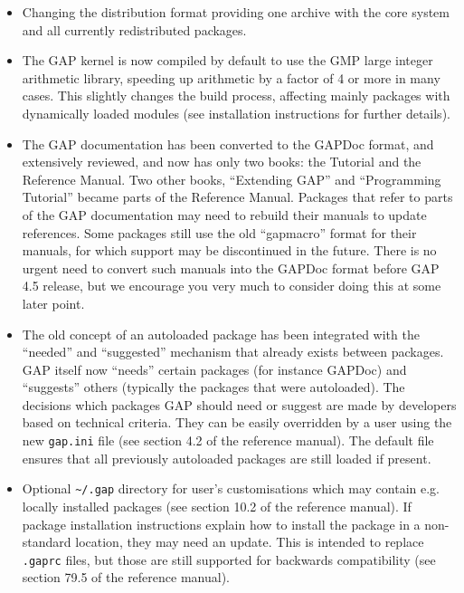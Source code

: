 \documentclass[10pt]{article}
\newcommand{\todo}[1]{}%
\begin{document}
\begin{itemize}

\item
Changing the distribution format providing one archive with the core system
and all currently redistributed packages.

\item
The GAP kernel is now compiled by default to use the GMP large integer arithmetic library, speeding up arithmetic by a factor of 4 or more in many cases.
 This slightly changes the build process, affecting mainly packages with dynamically loaded modules (see installation instructions for further details).

\todo{Document build options --with-gmp, --with-abi, --with-readline in the manual and README.}

\item
The GAP documentation has been converted to the GAPDoc format, and extensively reviewed, and now has only
two books: the Tutorial and the Reference Manual. Two other books, ``Extending 
GAP'' and ``Programming Tutorial'' became parts of the Reference Manual. Packages
that refer to parts of the GAP documentation may need to rebuild their manuals
to update references. Some packages still use the old ``gapmacro'' format for
their manuals, for which support may be discontinued in the future. There is no urgent need to convert such manuals into the GAPDoc format before GAP 4.5 release, but we 
encourage you very much to consider doing this at some later point. 

\item
The old concept of an autoloaded package has been integrated with the ``needed'' 
and ``suggested'' mechanism that already exists between packages. GAP itself 
now ``needs'' certain packages 
(for instance GAPDoc) and ``suggests'' others (typically the packages that were 
autoloaded). The decisions 
which packages GAP should need or suggest are made by developers based on 
technical criteria. They can be easily overridden by a user 
using the new \verb|gap.ini| file (see section 4.2 of the reference manual). 
The default file ensures that all previously autoloaded packages are still loaded if present.

\item
Optional \verb|~/.gap| directory for user's customisations which may contain e.g.
locally installed packages (see section 10.2 of the reference manual). If package installation instructions explain how
to install the package in a non-standard location, they may need an update. 
This is intended to replace \verb|.gaprc| files, but those are still supported 
for backwards compatibility (see section 79.5 of the reference manual).


\end{itemize}
\end{document}
